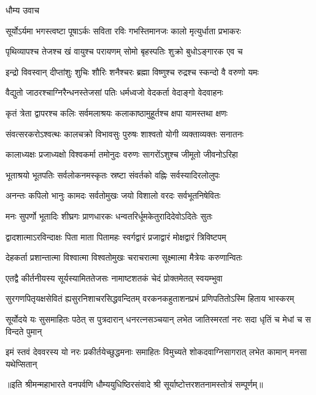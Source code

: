 

धौम्य उवाच

\twolineshloka
{सूर्योऽर्यमा भगस्त्वष्टा पूषाऽर्कः सविता रविः}
{गभस्तिमानजः कालो मृत्युर्धाता प्रभाकरः}

\twolineshloka
{पृथिव्यापश्च तेजश्च खं वायुश्च परायणम्}
{सोमो बृहस्पतिः शुक्रो बुधोऽङ्गारक एव च}

\twolineshloka
{इन्द्रो विवस्वान् दीप्तांशुः शुचिः शौरिः शनैश्चरः}
{ब्रह्मा विष्णुश्च रुद्रश्च स्कन्दो वै वरुणो यमः}

\twolineshloka
{वैद्युतो जाठरश्चाग्निरैन्धनस्तेजसां पतिः}
{धर्मध्वजो वेदकर्ता वेदाङ्गो वेदवाहनः}

\twolineshloka
{कृतं त्रेता द्वापरश्च कलिः सर्वमलाश्रयः}
{कलाकाष्ठामुहूर्तश्च क्षपा यामस्तथा क्षणः}

\twolineshloka
{संवत्सरकरोऽश्वत्थः कालचक्रो विभावसुः}
{पुरुषः शाश्वतो योगी व्यक्ताव्यक्तः सनातनः}

\twolineshloka
{कालाध्यक्षः प्रजाध्यक्षो विश्वकर्मा तमोनुदः}
{वरुणः सागरोंऽशुश्च जीमूतो जीवनोऽरिहा}

\twolineshloka
{भूताश्रयो भूतपतिः सर्वलोकनमस्कृतः}
{स्रष्टा संवर्तको वह्निः सर्वस्यादिरलोलुपः}

\twolineshloka
{अनन्तः कपिलो भानुः कामदः सर्वतोमुखः}
{जयो विशालो वरदः सर्वभूतनिषेवितः}

\twolineshloka
{मनः सुपर्णो भूतादिः शीघ्रगः प्राणधारकः}
{धन्वतरिर्धूमकेतुरादिदेवोऽदितेः सुतः}

\twolineshloka
{द्वादशात्माऽरविन्दाक्षः पिता माता पितामहः}
{स्वर्गद्वारं प्रजाद्वारं मोक्षद्वारं त्रिविष्टपम्}

\twolineshloka
{देहकर्ता प्रशान्तात्मा विश्वात्मा विश्वतोमुखः}
{चराचरात्मा सूक्ष्मात्मा मैत्रेयः करुणान्वितः}

\twolineshloka
{एतद्वै कीर्तनीयस्य सूर्यस्यामिततेजसः}
{नामाष्टशतकं चेदं प्रोक्तमेतत् स्वयम्भुवा}

\twolineshloka
{सुरगणपितृयक्षसेवितं ह्यसुरनिशाचरसिद्धवन्दितम्}
{वरकनकहुताशनप्रभं प्रणिपतितोऽस्मि हिताय भास्करम्}

\fourlineindentedshloka
{सूर्योदये यः सुसमाहितः पठेत्}
{स पुत्रदारान् धनरत्नसञ्चयान्}
{लभेत जातिस्मरतां नरः सदा}
{ धृतिं च मेधां च स विन्दते पुमान्}

\fourlineindentedshloka
{इमं स्तवं देववरस्य यो नरः}
{प्रकीर्तयेच्छुद्धमनाः समाहितः}
{विमुच्यते शोकदवाग्निसागरात्}
{लभेत कामान् मनसा यथेप्सितान्}

॥इति श्रीमन्महाभारते वनपर्वणि धौम्ययुधिष्ठिरसंवादे श्री सूर्याष्टोत्तरशतनामस्तोत्रं सम्पूर्णम्॥
